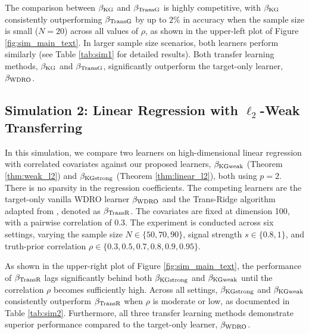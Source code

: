 \documentclass[12pt]{article}
\begin{document}
The comparison between $\beta_{\rm KG}$ and $\beta_{\rm TransG}$ is highly competitive, with $\beta_{\rm KG}$ consistently outperforming $\beta_{\rm TransG}$ by up to $2\%$ in accuracy when the sample size is small ($N = 20$) across all values of $\rho$, as shown in the upper-left plot of Figure \ref{fig:sim_main_text}. In larger sample size scenarios, both learners perform similarly (see Table \ref{tab:sim1} for detailed results). Both transfer learning methods, $\beta_{\rm KG}$ and $\beta_{\rm TransG}$, significantly outperform the target-only learner, $\beta_{\rm WDRO}$.

\subsection{Simulation 2: Linear Regression with \texorpdfstring{$\ell_2$}{l2}-Weak Transferring}

\label{subsec:sim2}
In this simulation, we compare two learners on high-dimensional linear regression with correlated covariates against our proposed learners, $\beta_{\rm KGweak}$ (Theorem \ref{thm:weak_l2}) and $\beta_{\rm KGstrong}$ (Theorem \ref{thm:linear_l2}), both using $p=2$. There is no sparsity in the regression coefficients. The competing learners are the target-only vanilla WDRO learner $\beta_{\rm WDRO}$ \citep[Theorem 1]{blanchet2019rwpi} and the Trans-Ridge algorithm adapted from \citep[Algorithm 1]{li2021translasso}, denoted as $\beta_{\rm TransR}$. The covariates are fixed at dimension 100, with a pairwise correlation of 0.3. The experiment is conducted across six settings, varying the sample size $N \in \{50, 70, 90\}$, signal strength $s \in \{0.8, 1\}$, and truth-prior correlation $\rho \in \{0.3, 0.5, 0.7, 0.8, 0.9, 0.95\}$.

As shown in the upper-right plot of Figure \ref{fig:sim_main_text}, the performance of $\beta_{\rm TransR}$ lags significantly behind both $\beta_{\rm KGstrong}$ and $\beta_{\rm KGweak}$ until the correlation $\rho$ becomes sufficiently high. Across all settings, $\beta_{\rm KGstrong}$ and $\beta_{\rm KGweak}$ consistently outperform $\beta_{\rm TransR}$ when $\rho$ is moderate or low, as documented in Table \ref{tab:sim2}. Furthermore, all three transfer learning methods demonstrate superior performance compared to the target-only learner, $\beta_{\rm WDRO}$. 
\end{document}
